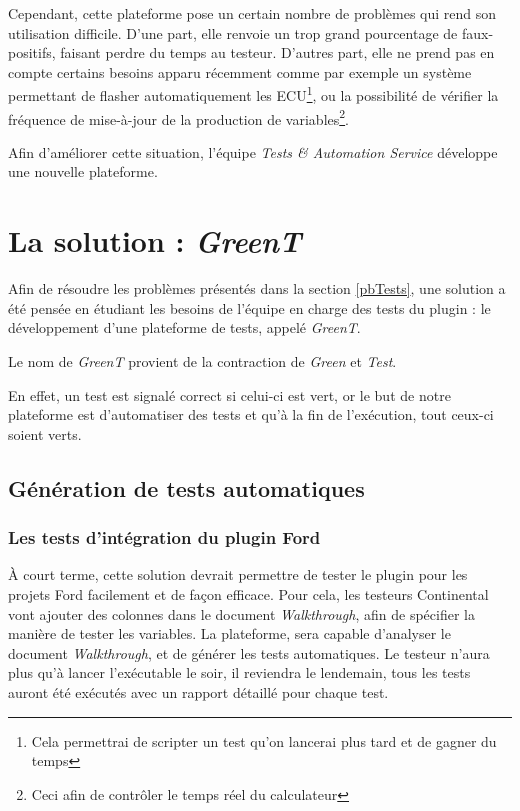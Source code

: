 	Cependant, cette plateforme pose un certain nombre de problèmes qui rend son utilisation difficile. D'une part, elle renvoie un trop grand pourcentage de faux-positifs, faisant perdre du temps au testeur. D'autres part, elle ne prend pas en compte certains besoins apparu récemment comme par exemple un système permettant de flasher automatiquement les ECU\footnote{Cela permettrai de scripter un test qu'on lancerai plus tard et de gagner du temps}, ou la possibilité de vérifier la fréquence de mise-à-jour de la production de variables\footnote{Ceci afin de contrôler le temps réel du calculateur}.

	Afin d'améliorer cette situation, l'équipe \textit{Tests \& Automation Service} développe une nouvelle plateforme.

	\section{La solution : \textit{GreenT}}
	Afin de résoudre les problèmes présentés dans la section \ref{pbTests}, une solution a été pensée en étudiant les besoins de l'équipe en charge des tests du plugin : le développement d'une plateforme de tests, appelé \textit{GreenT}.~\\

	\begin{remarque}
		Le nom de \textit{GreenT} provient de la contraction de \textit{Green} et \textit{Test}.
		
		En effet, un test est signalé correct si celui-ci est vert, or le but de notre plateforme est d'automatiser des tests et qu'à la fin de l'exécution, tout ceux-ci soient verts.
	\end{remarque}
	\subsection{Génération de tests automatiques}
	\subsubsection{Les tests d'intégration du plugin Ford}
	À court terme, cette solution devrait permettre de tester le plugin pour les projets Ford facilement et de façon efficace. Pour cela, les testeurs Continental vont ajouter des colonnes dans le document \textit{Walkthrough}, afin de spécifier la manière de tester les variables. La plateforme, sera capable d'analyser le document \textit{Walkthrough}, et de générer les tests automatiques. Le testeur n'aura plus qu'à lancer l'exécutable le soir, il reviendra le lendemain, tous les tests auront été exécutés avec un rapport détaillé pour chaque test.\\

